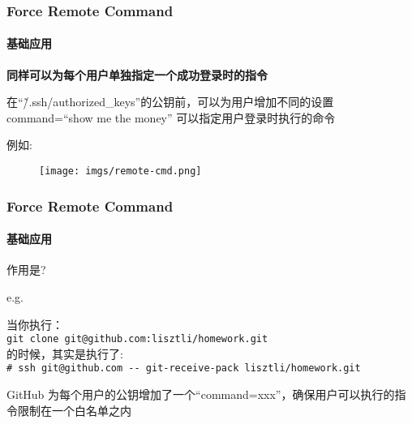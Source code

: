 \begin{frame}[fragile]
  \frametitle{Force Remote Command}
  \framesubtitle{基础应用}

  \textbf{同样可以为每个用户单独指定一个成功登录时的指令} \pause

  在``\~/.ssh/authorized\_keys''的公钥前，可以为用户增加不同的设置 \pause \\
  command=``show me the money'' 可以指定用户登录时执行的命令 \pause 
  \vspace{\baselineskip}

  例如:
  \begin{figure}[htbp]
    \centering
    \texttt{[image: imgs/remote-cmd.png]}
    \label{fig:ssh-remote-cmd}
  \end{figure}
\end{frame}


\begin{frame}[fragile]
  \frametitle{Force Remote Command}
  \framesubtitle{基础应用}

  作用是? \\
  \vspace{\baselineskip}
  \pause

  e.g.

  当你执行： \\
  \vspace{\baselineskip}
  \verb|git clone git@github.com:lisztli/homework.git|  \\
  \vspace{\baselineskip}
  的时候，其实是执行了: \\

  \vspace{\baselineskip}
  \verb|# ssh git@github.com -- git-receive-pack lisztli/homework.git|\\
  \pause

  \vspace{\baselineskip}
  GitHub 为每个用户的公钥增加了一个``command=xxx''，确保用户可以执行的指令限制在一个白名单之内
\end{frame}




